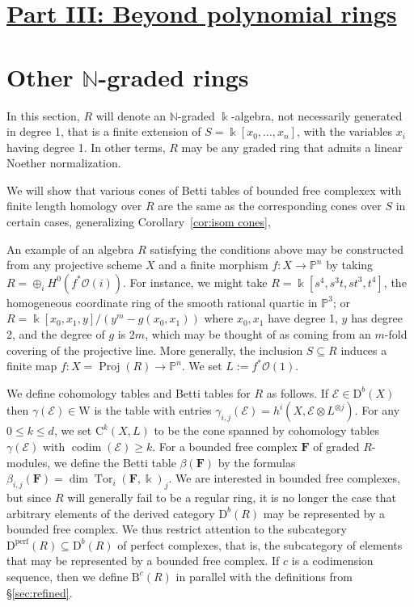 \documentclass[12pt]{amsart}
\theoremstyle{definition}
\theoremstyle{remark}
\newcommand{\Proj}{\operatorname{Proj}}
\newcommand{\Tor}{\operatorname{Tor}}
\newcommand{\kk}{\Bbbk}
\newcommand{\codim}{\operatorname{codim}}
\newcommand{\PP}{\mathbb{P}}
\newcommand{\WW}{\mathrm{W}}
\newcommand{\NN}{\mathbb{N}}
\newcommand{\cc}{c}
\newcommand{\cO}{\mathcal{O}}
\newcommand{\cE}{\mathcal{E}}
\newcommand{\FF}{\mathbf{F}}
\newcommand{\DD}{\mathrm{D}}
\newcommand{\CQ}{\mathrm{C}}
\newcommand{\BBQ}{\mathrm{B}}
\renewcommand{\P}{{\mathbb P}}
\begin{document}
\section*{\underline{{Part III: Beyond polynomial rings}}}
\section{Other $\NN$-graded rings}\label{sec:functor}
 In this section, $R$ will denote an $\NN$-graded $\kk$-algebra, not necessarily generated in degree 1, that is a finite extension of $S=\kk[x_0,\dots,x_n]$, with the variables $x_{i}$ having degree 1.  In other terms, $R$ may be any graded ring that admits a linear Noether normalization. 
 
 We will 
 show that various cones of Betti tables of
 bounded free complexex with finite length homology over $R$ are the same as the
 corresponding cones over $S$ in certain cases, generalizing Corollary~\ref{cor:isom cones}, 
 
An example of an algebra $R$ satisfying the conditions above may be constructed from any projective scheme $X$ and a finite morphism $f:X\to \PP^{n}$ by taking $R = \oplus_{i}H^{0}(f^{*}\cO(i))$. For instance, we might take
$R = \kk[s^{4}, s^{3}t, st^{3}, t^{4}]$, the homogeneous coordinate ring of the smooth rational
quartic in $\P^{3}$; or $R = \kk[x_{0}, x_{1}, y]/(y^{m}-g(x_{0}, x_{1}))$ where $x_{0},x_{1}$ have
degree 1, $y$ has degree 2, and the degree of $g$ is $2m$, which may be thought of as 
coming from an $m$-fold covering of the projective line.
 More generally, the inclusion $S\subseteq R$ induces a finite map $f\colon X=\Proj(R)\to \PP^n$. We set $L:=f^*\cO(1)$. 

We define cohomology tables and Betti tables for $R$ as follows. If $\cE\in \DD^b(X)$ then $\gamma(\cE)\in \WW$ is the table with entries $\gamma_{i,j}(\cE)=h^i(X,\cE\otimes L^{\otimes j})$.  For any $0\leq k \leq d$, we set $\CQ^{k}(X,L)$ to be the cone spanned by cohomology tables $\gamma(\cE)$ with $\codim(\cE)\geq k$.  For a bounded free complex $\FF$ of graded $R$-modules, we define the Betti table $\beta(\FF)$ by the formulas $\beta_{i,j}(\FF)=\dim \Tor_i(\FF,\kk)_j$.  
We are interested in bounded free complexes, but since $R$ will generally fail to be a regular ring, it is no longer the case that arbitrary elements of the derived category 
$\DD^b(R)$ may be represented by a bounded free complex.  
We thus restrict attention to the subcategory $\DD^{\text{perf}}(R)\subseteq \DD^b(R)$ of perfect complexes, that is, the subcategory of elements that may be
represented by a  bounded free complex.
If $\cc$ is a codimension sequence, then we define $\BBQ^{\cc}(R)$ in parallel with the definitions from \S\ref{sec:refined}.  
\end{document}
